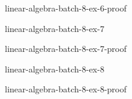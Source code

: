\documentclass[preview]{standalone}
\begin{document}
\begin{snippetsolution}{linear-algebra-batch-8-ex-6-proof}{}
    \todo
\end{snippetsolution}

\begin{snippetexercise}{linear-algebra-batch-8-ex-7}{}
    \todo
\end{snippetexercise}

\begin{snippetsolution}{linear-algebra-batch-8-ex-7-proof}{}
    \todo
\end{snippetsolution}

\begin{snippetexercise}{linear-algebra-batch-8-ex-8}{}
    \todo
\end{snippetexercise}

\begin{snippetsolution}{linear-algebra-batch-8-ex-8-proof}{}
    \todo
\end{snippetsolution}
\end{document}
